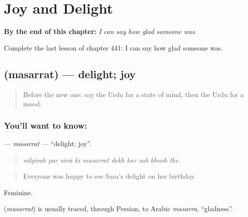 
\chapter{Joy and Delight}
\label{ch:ur-joy-and-delight}

\begin{chapteropening}
\textbf{By the end of this chapter:} \emph{I can say how glad someone was.}

Complete the last lesson of chapter 441: I can say how glad someone was.
\end{chapteropening}

\section[\texorpdfstring{\ur{مسرت} (masarrat)}{مسرت (masarrat)}]{ (masarrat) — delight; joy}

\label{lesson:UR-C441-masarrat}



\begin{quote}
Before the new one: say the Urdu for a state of mind, then the Urdu for a mood.
\end{quote}

\subsection*{You'll want to know: }
\textbf{} — \emph{masarrat} — \textquotedblleft{}delight; joy\textquotedblright{}.

\begin{quote}
         
\end{quote}

\begin{quote}
\emph{sālgirah par sārā kī masarrat dekh kar sab khush the.}
\end{quote}

\begin{quote}
Everyone was happy to see Sara's delight on her birthday.
\end{quote}

Feminine.

\begin{cousinweb}
\textbf{} (\emph{masarrat}) is usually traced, through Persian, to Arabic \emph{masarra}, \textquotedblleft{}gladness\textquotedblright{}.
\end{cousinweb}

